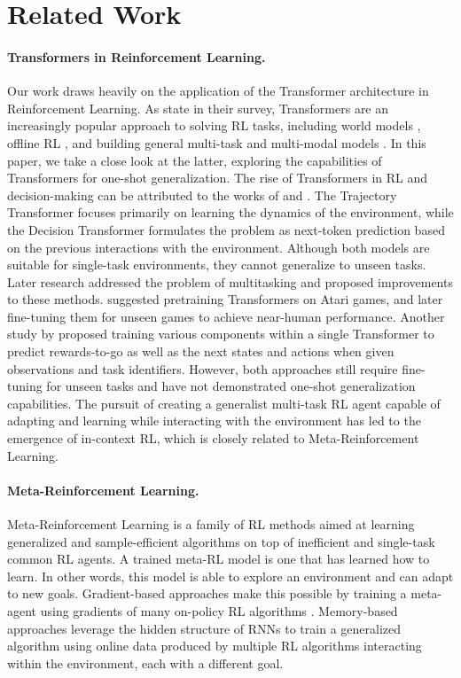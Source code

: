 \documentclass{article}
\theoremstyle{plain}
\theoremstyle{definition}
\theoremstyle{remark}
\begin{document}
\section{Related Work}
\paragraph{Transformers in Reinforcement Learning.}
Our work draws heavily on the application of the Transformer architecture \cite{vaswani2017attention} in Reinforcement Learning. As \citet{agarwal2023transformers} state in their survey, Transformers are an increasingly popular approach to solving RL tasks, including world models \cite{iris2023}, offline RL \cite{yamagata2022qlearning}, and building general multi-task and multi-modal models \cite{reed2022generalist}. In this paper, we take a close look at the latter, exploring the capabilities of Transformers for one-shot generalization. The rise of Transformers in RL and decision-making can be attributed to the works of \citet{chen2021decision} and \citet{janner2021sequence}. The Trajectory Transformer focuses primarily on learning the dynamics of the environment, while the Decision Transformer formulates the problem as next-token prediction based on the previous interactions with the environment. Although both models are suitable for single-task environments, they cannot generalize to unseen tasks. Later research addressed the problem of multitasking and proposed improvements to these methods. \citet{lee2022multi} suggested pretraining Transformers on Atari games, and later fine-tuning them for unseen games to achieve near-human performance. Another study by \citet{lin2022switch} proposed training various components within a single Transformer to predict rewards-to-go as well as the next states and actions when given observations and task identifiers. However, both approaches still require fine-tuning for unseen tasks and have not demonstrated one-shot generalization capabilities. The pursuit of creating a generalist multi-task RL agent capable of adapting and learning while interacting with the environment has led to the emergence of in-context RL, which is closely related to Meta-Reinforcement Learning.
\paragraph{Meta-Reinforcement Learning.}
Meta-Reinforcement Learning is a family of RL methods aimed at learning generalized and sample-efficient algorithms on top of inefficient and single-task common RL agents. A trained meta-RL model is one that has learned how to learn. In other words, this model is able to explore an environment and can adapt to new goals. Gradient-based approaches make this possible by training a meta-agent using gradients of many on-policy RL algorithms \cite{finn2017model}. Memory-based approaches leverage the hidden structure of RNNs \cite{hochreiter2001learning, duan2016rl, wang2016learning} to train a generalized algorithm using online data produced by multiple RL algorithms interacting within the environment, each with a different goal.
\end{document}
